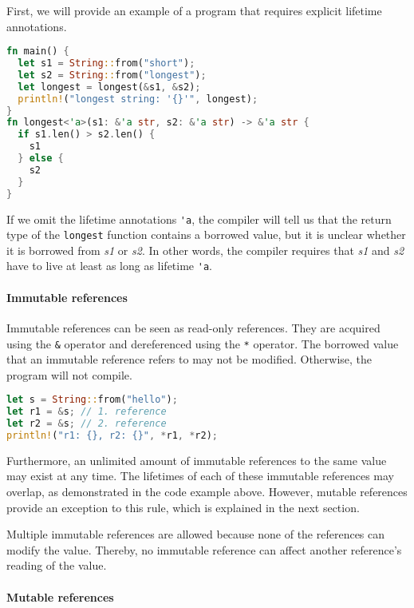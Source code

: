 \documentclass[sigplan,11pt,nonacm]{acmart}
\begin{document}
First, we will provide an example of a program that requires explicit lifetime annotations.

\begin{lstlisting}[language=Rust,captionpos=b,caption={Rust lifetime annotations}]
fn main() {
  let s1 = String::from("short");
  let s2 = String::from("longest");
  let longest = longest(&s1, &s2);
  println!("longest string: '{}'", longest);
}
fn longest<'a>(s1: &'a str, s2: &'a str) -> &'a str {
  if s1.len() > s2.len() {
    s1
  } else {
    s2
  }
}
\end{lstlisting}
If we omit the lifetime annotations \verb|'a|, the compiler will tell us that the return type of the \verb|longest| function contains a borrowed value, but it is unclear whether it is borrowed from \emph{s1} or \emph{s2}.
In other words, the compiler requires that \emph{s1} and \emph{s2} have to live at least as long as lifetime \verb|'a|.


\paragraph{Immutable references}

Immutable references can be seen as read-only references.
They are acquired using the \verb|&| operator and dereferenced using the \verb|*| operator.
The borrowed value that an immutable reference refers to may not be modified.
Otherwise, the program will not compile.

\begin{lstlisting}[language=Rust,captionpos=b,caption={Rust immutable references}]
let s = String::from("hello");
let r1 = &s; // 1. reference
let r2 = &s; // 2. reference
println!("r1: {}, r2: {}", *r1, *r2);
\end{lstlisting}

Furthermore, an unlimited amount of immutable references to the same value may exist at any time.
The lifetimes of each of these immutable references may overlap, as demonstrated in the code example above.
However, mutable references provide an exception to this rule, which is explained in the next section.

Multiple immutable references are allowed because none of the references can modify the value.
Thereby, no immutable reference can affect another reference's reading of the value.


\paragraph{Mutable references}
\end{document}
